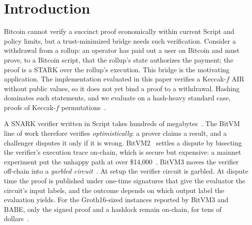 \documentclass[11pt]{article}
\begin{document}
\begin{abstract}
for a measured total on-chain cost. The
hash-based figures also exclude the unimplemented soldering from one key set to
the seven kept garblings; the arithmetic projection for seven independent key
sets, whose consistency protocol is also unimplemented, is
82.94--120.86\,MvB before the missing graph overhead. The measured proof system provides 104 classical bits and
about 52 quantum bits, whereas the reported cut-and-choose parameters provide
about 40 classical bits and Bitcoin's transaction signatures are not
post-quantum. Thus the artifact is a measured hash-based verifier and a cost
study, not a complete post-quantum Bitcoin protocol. Recursing a zkVM proof
through a narrow tape machine, with experimental and unreviewed changes to the
proof system that we list, brings the garbled verifier's input to 564{,}552
bits in 218.0M non-free gates. Each of its proofs meets 100 bits by Plonky3's
assessment, which does not count those changes, and the circuit binds neither
the zkVM program nor its outputs.
\end{abstract}

\section{Introduction}

Bitcoin cannot verify a succinct proof economically within current Script and
policy limits, but a trust-minimized bridge needs such verification. Consider a
withdrawal from a rollup: an operator has paid out a user on Bitcoin and must
prove, to a Bitcoin script, that the rollup's state authorizes the payment; the
proof is a STARK over the rollup's execution. This bridge is the motivating
application. The implementation evaluated in this paper verifies a Keccak-$f$
AIR without public values, so it does not yet bind a proof to a withdrawal.
Hashing dominates such statements, and we evaluate on a hash-heavy standard case,
proofs of Keccak-$f$ permutations~\cite{fips202}.

A SNARK verifier written in Script takes hundreds of megabytes~\cite{babe2026}.
The BitVM line of work therefore verifies \emph{optimistically}: a prover claims
a result, and a challenger disputes it only if it is wrong.
BitVM2~\cite{laa25bitvm2} settles a dispute by bisecting the verifier's
execution trace on-chain, which is secure but expensive: a mainnet experiment
put the unhappy path at over \$14{,}000~\cite{babe2026}. BitVM3 moves the
verifier off-chain into a \emph{garbled circuit}~\cite{lin25bitvm3,bitvm3paper,che25sok}.
At setup the verifier circuit is garbled. At dispute time the proof is published
under one-time signatures that give the evaluator the circuit's input labels, and
the outcome depends on which output label the evaluation yields. For the
Groth16-sized instances reported by BitVM3 and BABE, only the signed proof and
a hashlock remain on-chain, for tens of dollars~\cite{babe2026}.
\end{document}
